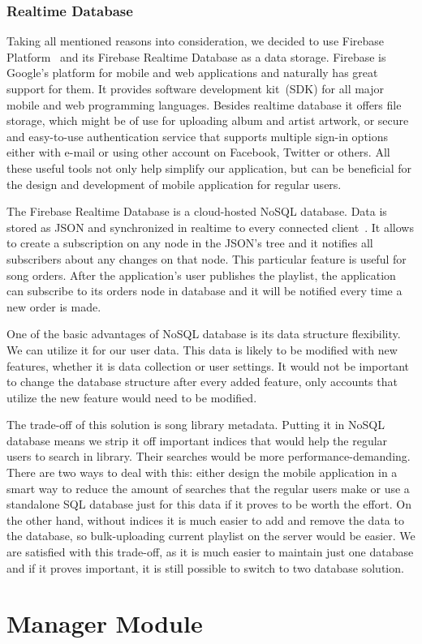 \subsubsection{Realtime Database}

Taking all mentioned reasons into consideration, we decided to use Firebase Platform~\citep{firebase} and its Firebase Realtime Database as a data storage. Firebase is Google's platform for mobile and web applications and naturally has great support for them. It provides software development kit~(SDK) for all major mobile and web programming languages. Besides realtime database it offers file storage, which might be of use for uploading album and artist artwork, or secure and easy-to-use authentication service that supports multiple sign-in options either with e-mail or using other account on Facebook, Twitter or others. All these useful tools not only help simplify our application, but can be beneficial for the design and development of mobile application for regular users.
\par
The Firebase Realtime Database is a cloud-hosted NoSQL database. Data is stored as JSON and synchronized in realtime to every connected client~\citep{firebaseDocs}. It allows to create a subscription on any node in the JSON's tree and it notifies all subscribers about any changes on that node. This particular feature is useful for song orders. After the application's user publishes the playlist, the application can subscribe to its orders node in database and it will be notified every time a new order is made.
\par
One of the basic advantages of NoSQL database is its data structure flexibility. We can utilize it for our user data. This data is likely to be modified with new features, whether it is data collection or user settings. It would not be important to change the database structure after every added feature, only accounts that utilize the new feature would need to be modified.
\par
The trade-off of this solution is song library metadata. Putting it in NoSQL database means we strip it off important indices that would help the regular users to search in library. Their searches would be more performance-demanding. There are two ways to deal with this: either design the mobile application in a smart way to reduce the amount of searches that the regular users make or use a standalone SQL database just for this data if it proves to be worth the effort. On the other hand, without indices it is much easier to add and remove the data to the database, so bulk-uploading current playlist on the server would be easier. We are satisfied with this trade-off, as it is much easier to maintain just one database and if it proves important, it is still possible to switch to two database solution.
\section {Manager Module}
